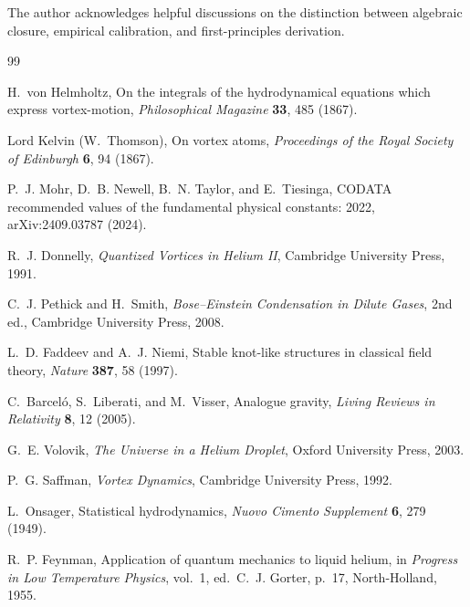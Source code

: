 \documentclass[aps,pra,preprint,longbibliography,nofootinbib]{revtex4-2}
\begin{document}
\begin{acknowledgments}
The author acknowledges helpful discussions on the distinction between
algebraic closure, empirical calibration, and first-principles
derivation.
\end{acknowledgments}

\begin{thebibliography}{99}

H.~von Helmholtz,
On the integrals of the hydrodynamical equations which express
vortex-motion,
\textit{Philosophical Magazine} \textbf{33}, 485 (1867).

Lord Kelvin (W.~Thomson),
On vortex atoms,
\textit{Proceedings of the Royal Society of Edinburgh} \textbf{6},
94 (1867).

P.~J. Mohr, D.~B. Newell, B.~N. Taylor, and E.~Tiesinga,
CODATA recommended values of the fundamental physical constants: 2022,
arXiv:2409.03787 (2024).

R.~J. Donnelly,
\textit{Quantized Vortices in Helium II},
Cambridge University Press, 1991.

C.~J. Pethick and H.~Smith,
\textit{Bose--Einstein Condensation in Dilute Gases}, 2nd ed.,
Cambridge University Press, 2008.

L.~D. Faddeev and A.~J. Niemi,
Stable knot-like structures in classical field theory,
\textit{Nature} \textbf{387}, 58 (1997).

C.~Barcel\'o, S.~Liberati, and M.~Visser,
Analogue gravity,
\textit{Living Reviews in Relativity} \textbf{8}, 12 (2005).

G.~E. Volovik,
\textit{The Universe in a Helium Droplet},
Oxford University Press, 2003.

P.~G. Saffman,
\textit{Vortex Dynamics},
Cambridge University Press, 1992.

L.~Onsager,
Statistical hydrodynamics,
\textit{Nuovo Cimento Supplement} \textbf{6}, 279 (1949).

R.~P. Feynman,
Application of quantum mechanics to liquid helium,
in \textit{Progress in Low Temperature Physics}, vol.~1,
ed.\ C.~J. Gorter, p.~17, North-Holland, 1955.


\end{thebibliography}
\end{document}
